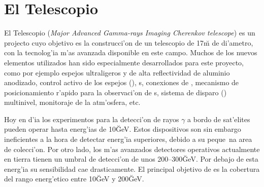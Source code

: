 
\chapter{El Telescopio \MAGIC}
\label{chapter:magic}

El Telescopio  (\emph{Major Advanced Gamma-rays Imaging
  Cherenkov telescope}) es un projecto cuyo objetivo es la
construcci'on de un telescopio \Cerenkov de 17\u{m} de di'ametro, con
la tecnolog'ia m'as avanzada disponible en este campo. Muchos de los
nuevos elementos utilizados han sido especialmente desarrollados para
este proyecto, como por ejemplo espejos ultraligeros y de alta
reflectividad de aluminio anodizado, control activo de los espejos
(), s, conexiones de , mecanismo de posicionamiento r'apido para la observaci'on
de s, sistema de disparo () multinivel, monitoraje
de la atm'osfera, etc.

Hoy en d'ia los experimentos para la detecci'on de rayos $\gamma$ a
bordo de sat'elites pueden operar hasta energ'ias de 10\u{GeV}. Estos
dispositivos son sin embargo ineficientes a la hora de detectar
energ'ia superiores, debido a su peque~na area de colecci'on. Por otro
lado, los m'as avanzados detectores \Cerenkov operativos actualmente
en tierra tienen un umbral de detecci'on de unos 200--300\u{GeV}. Por
debajo de esta energ'ia su sensibilidad cae drasticamente. El
principal objetivo de \MAGIC es la cobertura del rango energ'etico
entre 10\u{GeV} y 200\u{GeV}.
%
\energygapfig

